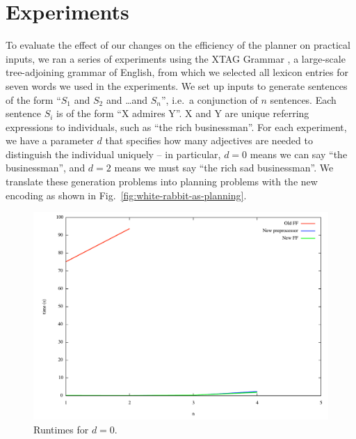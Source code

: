 \section{Experiments} 
\label{sec:experiments}

To evaluate the effect of our changes on the efficiency of the planner
on practical inputs, we ran a series of experiments using the XTAG
Grammar \cite{xtag01:_tr}, a large-scale tree-adjoining grammar of
English, from which we selected all lexicon entries for seven words we
used in the experiments. We set up inputs to generate sentences of the
form ``$S_1$ and $S_2$ and \ldots and $S_n$'', i.e.\ a conjunction of
$n$ sentences. Each sentence $S_i$ is of the form ``X admires Y''. X
and Y are unique referring expressions to individuals, such as ``the
rich businessman''. For each experiment, we have a parameter $d$ that
specifies how many adjectives are needed to distinguish the individual
uniquely -- in particular, $d=0$ means we can say ``the businessman'',
and $d=2$ means we must say ``the rich sad businessman''. We translate
these generation problems into planning problems with the new encoding
as shown in Fig.~\ref{fig:white-rabbit-as-planning}.

\begin{figure}[t]
  \centering
  \includegraphics[width=\columnwidth]{pics/xtag-k2-dist0}
  \caption{Runtimes for $d=0$.}
  \label{fig:runtimes-k2-dist0}
\end{figure}

